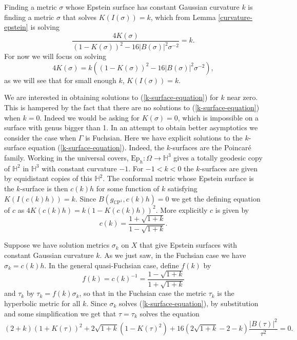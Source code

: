 \documentclass{amsart}
\newcommand{\CP}{\mathbb{C}\mathrm{P}}
\renewcommand{\H}{\mathbb{H}}
\begin{document}
Finding a metric $\sigma$ whose Epstein surface has constant Gaussian curvature $k$ is finding a metric $\sigma$ that solves $K(I(\sigma)) = k$, which from Lemma \ref{curvature-epstein} is solving
\[
\frac{4K(\sigma)}{(1-K(\sigma))^2 - 16|B(\sigma)|^2\sigma^{-2}} = k.
\]
For now we will focus on solving
\begin{equation}
\label{k-surface-equation}
4K(\sigma) = k \left((1-K(\sigma))^2 - 16|B(\sigma)|^2\sigma^{-2} \right),
\end{equation}
as we will see that for small enough $k$, $K(I(\sigma)) = k$.

We are interested in obtaining solutions to (\ref{k-surface-equation}) for $k$ near zero. 
This is hampered by the fact that there are no solutions to (\ref{k-surface-equation}) when $k = 0$. 
Indeed we would be asking for $K(\sigma)=0$, which is impossible on a surface with genus bigger than 1. 
In an attempt to obtain better asymptotics we consider the case when $\Gamma$ is Fuchsian. 
Here we have explicit solutions to the $k$-surface equation (\ref{k-surface-equation}).
Indeed, the $k$-surfaces are the Poincar\'e family. 
Working in the universal covers, $\mathrm{Ep}_h : \Omega \to \H^3$ gives a totally geodesic copy of $\H^2$ in $\H^3$ with constant curvature $-1$. 
For $-1<k<0$  the $k$-surfaces are given by equidistant copies of this $\H^2$. 
The conformal metric whose Epstein surface is the $k$-surface is then $c(k)h$ for some function of $k$ satisfying $K(I(c(k)h)) = k$. 
Since $B(g_{\CP^1},c(k)h) = 0$ we get the defining equation of $c$ as $4K(c(k)h) = k(1 - K(c(k)h))^2$.
More explicitly $c$ is given by
\[
c(k) = \frac{1+\sqrt{1+k}}{1-\sqrt{1+k}}.
\]


Suppose we have solution metrics $\sigma_k$  on $X$ that give Epstein surfaces with constant Gaussian curvature $k$. 
As we just saw, in the Fuchsian case we have $\sigma_k = c(k) h$.  
In the general quasi-Fuchsian case, define $f(k)$ by 
\[
f(k) = c(k)^{-1} = \frac{1-\sqrt{1+k}}{1+\sqrt{1+k}}
\] 
and $\tau_k$ by $\tau_k = f(k)\sigma_k$, so that in the Fuchsian case the metric $\tau_k$ is the hyperbolic metric for all $k$. 
Since $\sigma_k$ solves (\ref{k-surface-equation}), by substitution and some simplification we get that $\tau = \tau_k$ solves the equation 
\begin{equation}
\label{scaled-equation}
(2+k)(1+K(\tau))^2 + 2\sqrt{1+k}\left(1-K(\tau)^2\right) + 16\left(2\sqrt{1+k} - 2 - k  \right)\frac{|B(\tau)|^2}{\tau^2} = 0.
\end{equation}
\end{document}
